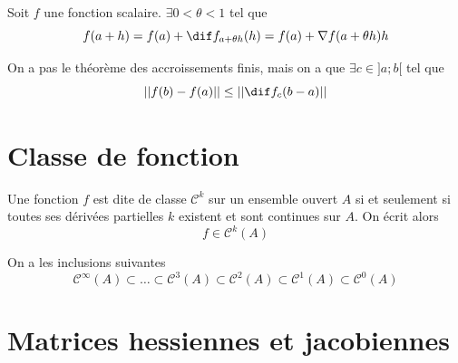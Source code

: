 \begin{mytheo}
Soit $f$ une fonction scalaire. $\exists 0 < \theta < 1$ tel que
	\[ f(a+h) = f(a) + \dif f_{a + \theta h}(h) = f(a) + \nabla f(a + \theta h)h \]
\end{mytheo}

\begin{myprop}
	On a pas le théorème des accroissements finis, mais on a que
	$\exists c \in ]a; b[$ tel que
	\[ || f(b) - f(a) || \leq || \dif f_c(b-a) || \]
\end{myprop}


\section{Classe de fonction}

\begin{mydef}
	Une fonction $f$ est dite de classe $\mathcal{C}^k$ sur un ensemble ouvert $A$ si et seulement si toutes ses dérivées partielles $k$\ieme{} existent et sont continues sur $A$. On écrit alors
	\[ f \in \mathcal{C}^k(A) \]
\end{mydef}

\begin{myprop} On a les inclusions suivantes
	\[ \mathcal{C}^{\infty}(A) \subset \dots \subset \mathcal{C}^3(A) \subset \mathcal{C}^2(A) \subset \mathcal{C}^1(A) \subset \mathcal{C}^0(A) \]
\end{myprop}


\section{Matrices hessiennes et jacobiennes}

